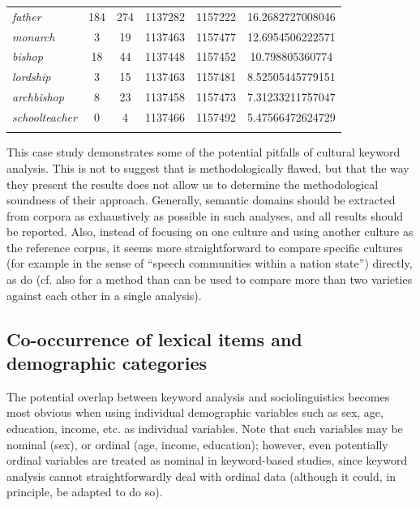 \begin{table}
{\begin{tabular}[t]{l *{2}{S[table-format=3]} *{2}{S[table-format=7]} S[table-format=2.2]}
\textit{father} & 184 & 274 & 1137282 & 1157222 & 16.2682727008046 \\
\textit{monarch} & 3 & 19 & 1137463 & 1157477 & 12.6954506222571 \\
\textit{bishop} & 18 & 44 & 1137448 & 1157452 & 10.798805360774 \\
\textit{lordship} & 3 & 15 & 1137463 & 1157481 & 8.52505445779151 \\
\textit{archbishop} & 8 & 23 & 1137458 & 1157473 & 7.31233211757047 \\
\textit{schoolteacher} & 0 & 4 & 1137466 & 1157492 & 5.47566472624729 \\
\lspbottomrule
\end{tabular}}
\end{table}

This case study demonstrates some of the potential pitfalls of cultural  keyword  analysis. This is not to suggest that \citet{wolf_fixed_2007} is methodologically flawed, but that the way they present the results does not allow us to determine the methodological soundness of their approach. Generally, semantic  domains should be extracted  from corpora as exhaustively as possible in such analyses, and all results should be reported. Also, instead of focusing on one culture  and using another culture as the reference corpus, it seems more straightforward to compare specific cultures  (for example in the sense of ``speech communities within a nation state'') directly, as \citet{leech_computer_1992} do (cf. also \citealt{oakes_use_2007} for a method than can be used to compare more than two varieties  against each other in a single analysis).

\subsection{Co\hyp{}occurrence of lexical items and demographic categories}\label{sec:co-occurrenceoflexicalitemsanddemographiccategories}

The potential overlap between keyword  analysis and sociolinguistics  becomes most obvious when using individual demographic  variables such as sex, age,  education, income, etc. as individual variables. Note that such variables may be nominal  (sex), or ordinal (age,  income, education); however, even potentially ordinal  variables are treated as nominal in keyword\hyp{}based  studies, since keyword analysis cannot straightforwardly deal with ordinal data (although it could, in principle, be adapted to do so).

